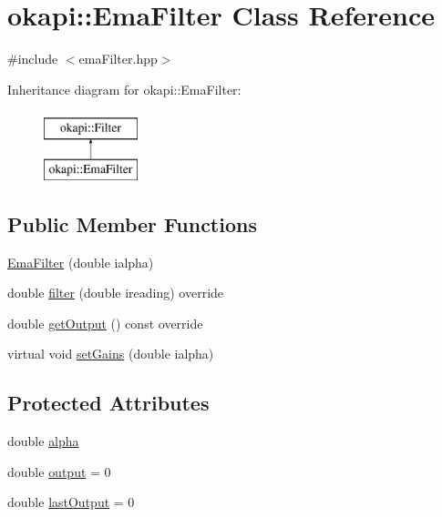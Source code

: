 \hypertarget{classokapi_1_1EmaFilter}{}\section{okapi\+::Ema\+Filter Class Reference}
\label{classokapi_1_1EmaFilter}


{\ttfamily \#include $<$ema\+Filter.\+hpp$>$}

Inheritance diagram for okapi\+::Ema\+Filter\+:\begin{figure}[H]
\begin{center}
\leavevmode
\includegraphics[height=2.000000cm]{classokapi_1_1EmaFilter}
\end{center}
\end{figure}
\subsection*{Public Member Functions}
\begin{DoxyCompactItemize}
\item 
\mbox{\hyperlink{classokapi_1_1EmaFilter_a3e8e6387c71778a44fcdaee79b2f8f66}{Ema\+Filter}} (double ialpha)
\item 
double \mbox{\hyperlink{classokapi_1_1EmaFilter_aeb460ae6655441806591e076342245de}{filter}} (double ireading) override
\item 
double \mbox{\hyperlink{classokapi_1_1EmaFilter_a883bc02a7244be54f947b6daaa63c0fe}{get\+Output}} () const override
\item 
virtual void \mbox{\hyperlink{classokapi_1_1EmaFilter_a7a06fdf0d25a489ac0bfc1a6a20b7d9f}{set\+Gains}} (double ialpha)
\end{DoxyCompactItemize}
\subsection*{Protected Attributes}
\begin{DoxyCompactItemize}
\item 
double \mbox{\hyperlink{classokapi_1_1EmaFilter_abaf5500df98574b5bf6f8d9a8a4331b5}{alpha}}
\item 
double \mbox{\hyperlink{classokapi_1_1EmaFilter_a015a76278c1b89144ff5a3b6bf03d7b8}{output}} = 0
\item 
double \mbox{\hyperlink{classokapi_1_1EmaFilter_a37c4fd3b6f355a49bc8b78790d3b3089}{last\+Output}} = 0
\end{DoxyCompactItemize}


